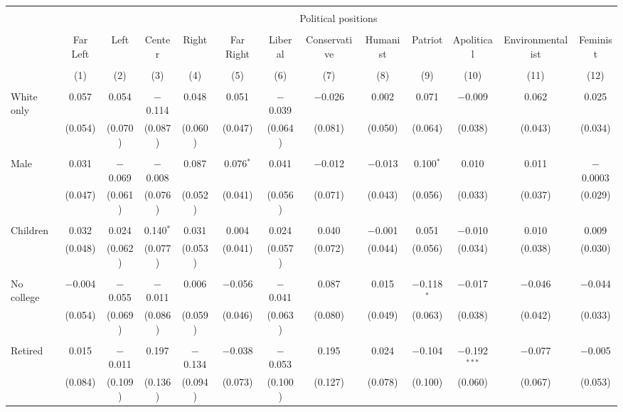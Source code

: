 
\begin{tabular}{@{\extracolsep{5pt}}lcccccccccccc} 
\\[-1.8ex]\hline 
\hline \\[-1.8ex] 
 & \multicolumn{12}{c}{Political positions} \\ 
\cline{2-13} 
\\[-1.8ex] & Far Left & Left & Center & Right & Far Right & Liberal & Conservative & Humanist & Patriot & Apolitical & Environmentalist & Feminist \\ 
\\[-1.8ex] & (1) & (2) & (3) & (4) & (5) & (6) & (7) & (8) & (9) & (10) & (11) & (12)\\ 
\hline \\[-1.8ex] 
 White only & 0.057 & 0.054 & $-$0.114 & 0.048 & 0.051 & $-$0.039 & $-$0.026 & 0.002 & 0.071 & $-$0.009 & 0.062 & 0.025 \\ 
  & (0.054) & (0.070) & (0.087) & (0.060) & (0.047) & (0.064) & (0.081) & (0.050) & (0.064) & (0.038) & (0.043) & (0.034) \\ 
  & & & & & & & & & & & & \\ 
 Male & 0.031 & $-$0.069 & $-$0.008 & 0.087 & 0.076$^{*}$ & 0.041 & $-$0.012 & $-$0.013 & 0.100$^{*}$ & 0.010 & 0.011 & $-$0.0003 \\ 
  & (0.047) & (0.061) & (0.076) & (0.052) & (0.041) & (0.056) & (0.071) & (0.043) & (0.056) & (0.033) & (0.037) & (0.029) \\ 
  & & & & & & & & & & & & \\ 
 Children & 0.032 & 0.024 & 0.140$^{*}$ & 0.031 & 0.004 & 0.024 & 0.040 & $-$0.001 & 0.051 & $-$0.010 & 0.010 & 0.009 \\ 
  & (0.048) & (0.062) & (0.077) & (0.053) & (0.041) & (0.057) & (0.072) & (0.044) & (0.056) & (0.034) & (0.038) & (0.030) \\ 
  & & & & & & & & & & & & \\ 
 No college & $-$0.004 & $-$0.055 & $-$0.011 & 0.006 & $-$0.056 & $-$0.041 & 0.087 & 0.015 & $-$0.118$^{*}$ & $-$0.017 & $-$0.046 & $-$0.044 \\ 
  & (0.054) & (0.069) & (0.086) & (0.059) & (0.046) & (0.063) & (0.080) & (0.049) & (0.063) & (0.038) & (0.042) & (0.033) \\ 
  & & & & & & & & & & & & \\ 
 Retired & 0.015 & $-$0.011 & 0.197 & $-$0.134 & $-$0.038 & $-$0.053 & 0.195 & 0.024 & $-$0.104 & $-$0.192$^{***}$ & $-$0.077 & $-$0.005 \\ 
  & (0.084) & (0.109) & (0.136) & (0.094) & (0.073) & (0.100) & (0.127) & (0.078) & (0.100) & (0.060) & (0.067) & (0.053) \\ 

\end{tabular}
